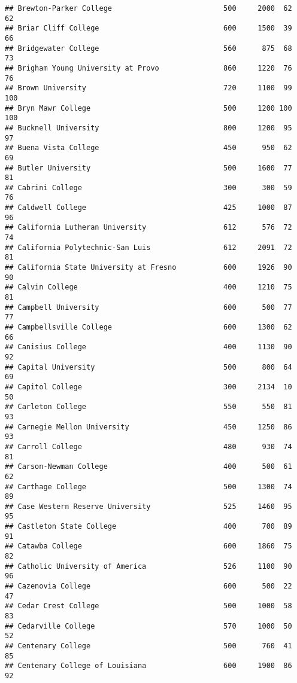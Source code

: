 \documentclass[
]{article}
\begin{document}
\begin{verbatim}
## Brewton-Parker College                          500     2000  62       62
## Briar Cliff College                             600     1500  39       66
## Bridgewater College                             560      875  68       73
## Brigham Young University at Provo               860     1220  76       76
## Brown University                                720     1100  99      100
## Bryn Mawr College                               500     1200 100      100
## Bucknell University                             800     1200  95       97
## Buena Vista College                             450      950  62       69
## Butler University                               500     1600  77       81
## Cabrini College                                 300      300  59       76
## Caldwell College                                425     1000  87       96
## California Lutheran University                  612      576  72       74
## California Polytechnic-San Luis                 612     2091  72       81
## California State University at Fresno           600     1926  90       90
## Calvin College                                  400     1210  75       81
## Campbell University                             600      500  77       77
## Campbellsville College                          600     1300  62       66
## Canisius College                                400     1130  90       92
## Capital University                              500      800  64       69
## Capitol College                                 300     2134  10       50
## Carleton College                                550      550  81       93
## Carnegie Mellon University                      450     1250  86       93
## Carroll College                                 480      930  74       81
## Carson-Newman College                           400      500  61       62
## Carthage College                                500     1300  74       89
## Case Western Reserve University                 525     1460  95       95
## Castleton State College                         400      700  89       91
## Catawba College                                 600     1860  75       82
## Catholic University of America                  526     1100  90       96
## Cazenovia College                               600      500  22       47
## Cedar Crest College                             500     1000  58       83
## Cedarville College                              570     1000  50       52
## Centenary College                               500      760  41       85
## Centenary College of Louisiana                  600     1900  86       92

\end{verbatim}
\end{document}
